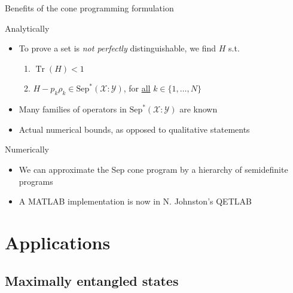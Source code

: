 \documentclass{beamer}
\newcommand{\tr}{\operatorname{Tr}}
\def\X{\mathcal{X}}
\def\Y{\mathcal{Y}}
\newcommand{\setft}[1]{\mathrm{#1}}
\newcommand{\BPos}{\setft{Sep}^{\ast}}
\begin{document}
    \begin{frame}{Benefits of the cone programming formulation}
      \begin{block}{Analytically}
        \begin{itemize}
          \item To prove a set is \emph{not perfectly} distinguishable, we find $H$ s.t.
            \begin{enumerate}
                \item $\tr(H) < 1$
                \item $H-p_k\rho_k \in \BPos(\X:\Y)$, for \underline{all} $k\in\{1, \ldots,N\}$
            \end{enumerate}
          \item Many families of operators in $\BPos(\X:\Y)$ are known
          \item Actual numerical bounds, as opposed to qualitative statements
        \end{itemize}
      \end{block}
      \begin{block}{Numerically}
        \begin{itemize}
          \item We can approximate the Sep cone program by a hierarchy of semidefinite programs
          \item A MATLAB implementation is now in N. Johnston's QETLAB
        \end{itemize}
      \end{block}
    \end{frame}

  \section{Applications}
  \subsection{Maximally entangled states}
\end{document}

